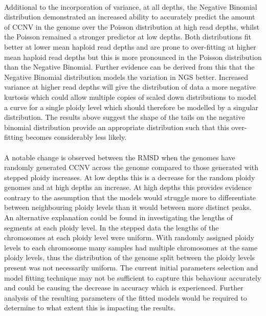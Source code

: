 \documentclass[11pt]{article}
\begin{document}
\paragraph{}Additional to the incorporation of variance, at all depths, the Negative Binomial distribution demonstrated an increased ability to accurately predict the amount of CCNV in the genome over the Poisson distribution at high read depths, whilst the Poisson remained a stronger predictor at low depths. Both distributions fit better at lower mean haploid read depths and are prone to over-fitting at higher mean haploid read depths but this is more pronounced in the Poisson distribution than the Negative Binomial. Further evidence can be derived from this that the Negative Binomial distribution models the variation in NGS better. Increased variance at higher read depths will give the distribution of data a more negative kurtosis which could allow multiple copies of scaled down distributions to model a curve  for a single ploidy level which should therefore be modelled by a singular distribution. The results above suggest the shape of the tails on the negative binomial distribution provide an appropriate distribution such that this over-fitting becomes considerably less likely. \\  
\paragraph{}A notable change is observed between the RMSD when the genomes have randomly generated CCNV across the genome compared to those generated with stepped ploidy increases. At low depths this is a decrease for the random ploidy genomes and at high depths an increase. At high depths this provides evidence contrary to the assumption that the models would struggle more to differentiate between neighbouring ploidy levels than it would between more distinct peaks. An alternative explanation could be found in investigating the lengths of segments at each ploidy level. In the stepped data the lengths of the chromosomes at each ploidy level were uniform. With randomly assigned ploidy levels to each chromosome many samples had multiple chromosomes at the same ploidy levels, thus the distribution of the genome split between the ploidy levels present was not necessarily uniform. The current initial parameters selection and model fitting technique may not be sufficient to capture this behaviour accurately and could be causing the decrease in accuracy which is experienced. Further analysis of the resulting parameters of the fitted models would be required to determine to what extent this is impacting the results.\\  
\end{document}

